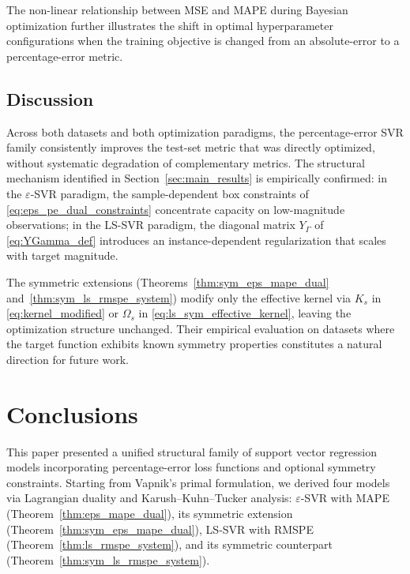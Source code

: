 \documentclass[mathematics,article,submit,pdftex,moreauthors]{Definitions/mdpi}
\begin{document}
The non-linear relationship between MSE and MAPE during
Bayesian optimization further illustrates the shift in
optimal hyperparameter configurations when the training
objective is changed from an absolute-error to a
percentage-error metric.

\subsection{Discussion}\label{subsec:cs_discussion}

Across both datasets and both optimization paradigms,
the percentage-error SVR family consistently improves
the test-set metric that was directly optimized, without
systematic degradation of complementary metrics.
The structural mechanism identified in
Section~\ref{sec:main_results} is empirically confirmed:
in the $\varepsilon$-SVR paradigm, the sample-dependent
box constraints of \eqref{eq:eps_pe_dual_constraints}
concentrate capacity on low-magnitude observations;
in the LS-SVR paradigm, the diagonal matrix $Y_\Gamma$
of \eqref{eq:YGamma_def} introduces an instance-dependent
regularization that scales with target magnitude.

The symmetric extensions (Theorems~\ref{thm:sym_eps_mape_dual}
and~\ref{thm:sym_ls_rmspe_system}) modify only the effective
kernel via $K_s$ in \eqref{eq:kernel_modified} or $\Omega_s$
in \eqref{eq:ls_sym_effective_kernel}, leaving the
optimization structure unchanged.
Their empirical evaluation on datasets where the target
function exhibits known symmetry properties constitutes
a natural direction for future work.

\section{Conclusions}\label{sec:conclusions}

This paper presented a unified structural family of support vector
regression models incorporating percentage-error loss functions
and optional symmetry constraints.
Starting from Vapnik's primal formulation, we derived four models
via Lagrangian duality and Karush--Kuhn--Tucker analysis:
$\varepsilon$-SVR with MAPE (Theorem~\ref{thm:eps_mape_dual}),
its symmetric extension (Theorem~\ref{thm:sym_eps_mape_dual}),
LS-SVR with RMSPE (Theorem~\ref{thm:ls_rmspe_system}),
and its symmetric counterpart (Theorem~\ref{thm:sym_ls_rmspe_system}).
\end{document}
